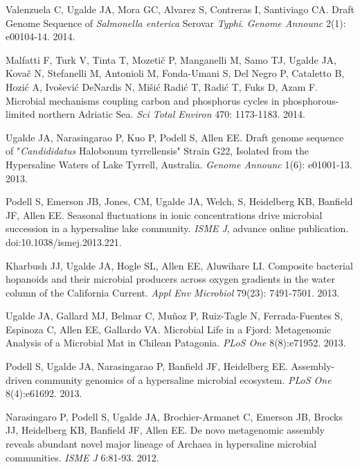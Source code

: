 \begin{frontmatter}
\begin{vitapage}
\begin{publications}
  \item Valenzuela C, Ugalde JA, Mora GC, Alvarez S, Contreras I, Santiviago CA. Draft Genome Sequence of \emph{Salmonella enterica} Serovar \emph{Typhi}.  \emph{Genome Announc} 2(1): e00104-14. 2014.

  \item Malfatti F, Turk V, Tinta T, Mozeti\v{c} P, Manganelli M, Samo TJ, Ugalde JA, Kova\v{c} N, Stefanelli M, Antonioli M, Fonda-Umani S, Del Negro P, Cataletto B, Hozi\'{c} A, Ivo\v{s}evi\'{c} DeNardis N, Mi\v{s}i\'{c} Radi\'{c} T, Radi\'{c} T, Fuks D, Azam F. Microbial mechanisms coupling carbon and phosphorus cycles in phosphorous-limited northern Adriatic Sea. \emph{Sci Total Environ} 470: 1173-1183. 2014.
  
  \item Ugalde JA, Narasingarao P, Kuo P, Podell S, Allen EE. Draft genome sequence of "\emph{Candididatus} Halobonum tyrrellensis" Strain G22, Isolated from the Hypersaline Waters of Lake Tyrrell, Australia.  \emph{Genome Announc} 1(6): e01001-13. 2013.
  
  \item Podell S, Emerson JB, Jones, CM, Ugalde JA, Welch, S, Heidelberg KB, Banfield JF, Allen EE. Seasonal fluctuations in ionic concentrations drive microbial succession in a hypersaline lake community. \emph{ISME J}, advance online publication. doi:10.1038/ismej.2013.221.
  
  \item Kharbush JJ, Ugalde JA, Hogle SL, Allen EE, Aluwihare LI. Composite bacterial hopanoids and their microbial producers across oxygen gradients in the water column of the California Current. \emph{Appl Env Microbiol} 79(23): 7491-7501. 2013.
  
  \item Ugalde JA, Gallard MJ, Belmar C, Mu\~{n}oz P, Ruiz-Tagle N, Ferrada-Fuentes S, Espinoza C, Allen EE, Gallardo VA. Microbial Life in a Fjord: Metagenomic Analysis of a Microbial Mat in Chilean Patagonia. \emph{PLoS One} 8(8):e71952. 2013.
  
  \item Podell S, Ugalde JA, Narasingarao P, Banfield JF, Heidelberg EE. Assembly-driven community genomics of a hypersaline microbial ecosystem. \emph{PLoS One} 8(4):e61692. 2013.
  
   \item Narasingaro P, Podell S, Ugalde JA, Brochier-Armanet C, Emerson JB, Brocks JJ, Heidelberg KB, Banfield JF, Allen EE. De novo metagenomic assembly reveals abundant novel major lineage of Archaea in hypersaline microbial communities. \emph{ISME J} 6:81-93. 2012.
  

\end{publications}
\end{vitapage}
\end{frontmatter}
